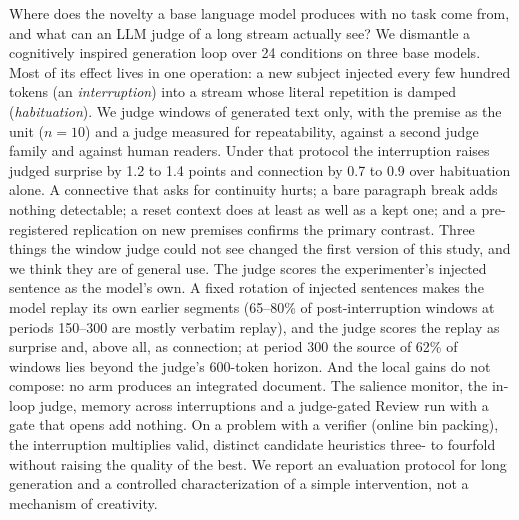 Where does the novelty a base language model produces with no task come
from, and what can an LLM judge of a long stream actually see? We dismantle a
cognitively inspired generation loop over 24 conditions on three base models.
Most of its effect lives in one operation: a new subject injected every few
hundred tokens (an \emph{interruption}) into a stream whose literal
repetition is damped (\emph{habituation}). We judge windows of generated text
only, with the premise as the unit ($n=10$) and a judge measured for
repeatability, against a second judge family and against human readers.
Under that protocol the interruption raises judged surprise by 1.2 to 1.4
points and connection by 0.7 to 0.9 over habituation alone. A connective
that asks for continuity hurts; a bare paragraph break adds nothing
detectable; a reset context does at least as well as a kept one; and a
pre-registered replication on new premises confirms the primary contrast.
Three things the window judge could not see changed the first version of
this study, and we think they are of general use. The judge scores the
experimenter's injected sentence as the model's own. A fixed rotation of
injected sentences makes the model replay its own earlier segments (65--80\%
of post-interruption windows at periods 150--300 are mostly verbatim
replay), and the judge scores the replay as surprise and, above all, as
connection; at period 300 the source of 62\% of windows lies beyond the
judge's 600-token horizon. And the local gains do not compose: no arm
produces an integrated document. The
salience monitor, the in-loop judge, memory across interruptions and a
judge-gated Review run with a gate that opens add nothing. On a problem with
a verifier (online bin packing), the interruption multiplies valid, distinct
candidate heuristics three- to fourfold without raising the quality of the
best. We report an evaluation protocol for long generation and a controlled
characterization of a simple intervention, not a mechanism of creativity.
